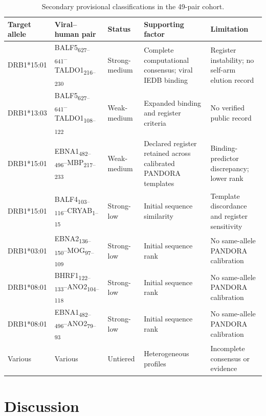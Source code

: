 \documentclass[11pt]{article}
\newcommand{\pep}[2]{#1\textsubscript{#2}}
\begin{document}
\begin{table}[H]\centering\scriptsize
\caption{Secondary provisional classifications in the 49-pair cohort.}
\setlength{\tabcolsep}{2pt}\renewcommand{\arraystretch}{1.2}
\begin{tabular}{p{}p{}p{}p{}p{}}
\toprule Target allele & Viral--human pair & Status & Supporting factor & Limitation \\\midrule
DRB1*15:01 & \pep{BALF5}{627--641}--\pep{TALDO1}{216--230} & Strong-medium & Complete computational consensus; viral IEDB binding & Register instability; no self-arm elution record\\
DRB1*13:03 & \pep{BALF5}{627--641}--\pep{TALDO1}{108--122} & Weak-medium & Expanded binding and register criteria & No verified public record\\
DRB1*15:01 & \pep{EBNA1}{482--496}--\pep{MBP}{217--233} & Weak-medium & Declared register retained across calibrated PANDORA templates & Binding-predictor discrepancy; lower rank\\
DRB1*15:01 & \pep{BALF4}{103--116}--\pep{CRYAB}{1--15} & Strong-low & Initial sequence similarity & Template discordance and register sensitivity\\
DRB1*03:01 & \pep{EBNA2}{136--150}--\pep{MOG}{97--109} & Strong-low & Initial sequence rank & No same-allele PANDORA calibration\\
DRB1*08:01 & \pep{BHRF1}{122--133}--\pep{ANO2}{104--118} & Strong-low & Initial sequence rank & No same-allele PANDORA calibration\\
DRB1*08:01 & \pep{EBNA1}{482--496}--\pep{ANO2}{79--93} & Strong-low & Initial sequence rank & No same-allele PANDORA calibration\\
Various & Various & Untiered & Heterogeneous profiles & Incomplete consensus or evidence\\\bottomrule
\end{tabular}\end{table}

\section{Discussion}
\end{document}
